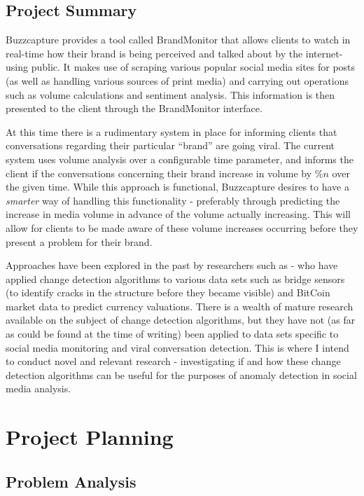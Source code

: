 \documentclass{uvamscse}
\begin{document}
\section{Project Summary}

Buzzcapture provides a tool called BrandMonitor that allows clients to watch in real-time how their brand is being perceived and talked about by the internet-using public. It makes use of scraping various popular social media sites for posts (as well as handling various sources of print media) and carrying out operations such as volume calculations and sentiment analysis. This information is then presented to the client through the BrandMonitor interface.

At this time there is a rudimentary system in place for informing clients that conversations regarding their particular “brand” are going viral. The current system uses volume analysis over a configurable time parameter, and informs the client if the conversations concerning their brand increase in volume by \(\%n\) over the given time. While this approach is functional, Buzzcapture desires to have a \textit{smarter} way of handling this functionality - preferably through predicting the increase in media volume in advance of the volume actually increasing. This will allow for clients to be made aware of these volume increases occurring before they present a problem for their brand.

Approaches have been explored in the past by researchers such as \citeauthor{BuntainChanges2014} - who have applied change detection algorithms to various data sets such as bridge sensors (to identify cracks in the structure before they became visible) and BitCoin market data to predict currency valuations\cite{BuntainChanges2014}. There is a wealth of mature research available on the subject of change detection algorithms, but they have not (as far as could be found at the time of writing) been applied to data sets specific to social media monitoring and viral conversation detection. This is where I intend to conduct novel and relevant research - investigating if and how these change detection algorithms can be useful for the purposes of anomaly detection in social media analysis.

\chapter{Project Planning}

\section{Problem Analysis}
\end{document}
